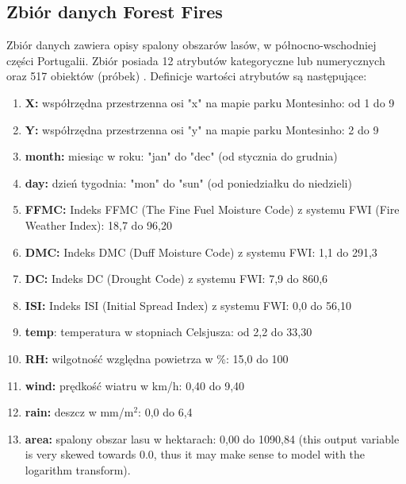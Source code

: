 \documentclass[10pt,a4paper]{article}
\begin{document}
\subsection{Zbiór danych Forest Fires}
Zbiór danych zawiera opisy spalony obszarów lasów, w północno-wschodniej części Portugalii. Zbiór posiada 12 atrybutów kategoryczne lub numerycznych oraz 517 obiektów (próbek) \cite{ForestFiresDS}. Definicje wartości atrybutów są następujące:
\begin{enumerate}
	\item \textbf{X:} współrzędna przestrzenna osi "x" na mapie parku Montesinho: od 1 do 9
	\item \textbf{Y:} współrzędna przestrzenna osi "y" na mapie parku Montesinho: 2 do 9
	\item \textbf{month:} miesiąc w roku: "jan" do "dec" (od stycznia do grudnia)
	\item \textbf{day:} dzień tygodnia: "mon" do "sun" (od poniedziałku do niedzieli)
	\item \textbf{FFMC:} Indeks FFMC (The Fine Fuel Moisture Code) z systemu FWI (Fire Weather Index): 18,7 do 96,20
	\item \textbf{DMC:} Indeks DMC (Duff Moisture Code) z systemu FWI: 1,1 do 291,3
	\item \textbf{DC:} Indeks DC (Drought Code) z systemu FWI: 7,9 do 860,6
	\item \textbf{ISI:} Indeks ISI (Initial Spread Index) z systemu FWI: 0,0 do 56,10
	\item \textbf{temp}: temperatura w stopniach Celsjusza: od 2,2 do 33,30
	\item \textbf{RH:} wilgotność względna powietrza w \%: 15,0 do 100
	\item \textbf{wind:} prędkość wiatru w km/h: 0,40 do 9,40
	\item \textbf{rain:} deszcz w mm/m$^2$: 0,0 do 6,4
	\item \textbf{area:} spalony obszar lasu w hektarach: 0,00 do 1090,84
(this output variable is very skewed towards 0.0, thus it may make sense to model with the logarithm transform). 
\end{enumerate}
\end{document}
